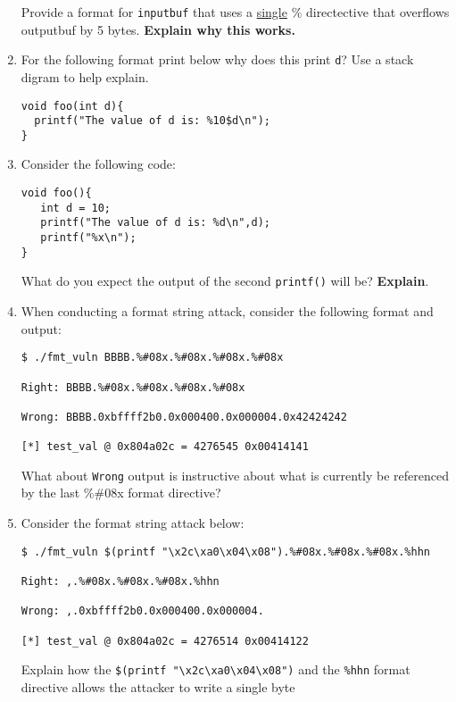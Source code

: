 \documentclass{article}[9pt]
\begin{document}
\begin{enumerate}
Provide a format for \texttt{inputbuf} that uses a \uline{single} \%
directective that overflows outputbuf by 5 bytes. \textbf{Explain why
this works.}

\item For the following format print below why does this print \texttt{d}? Use
a stack digram to help explain.

\begin{verbatim}
void foo(int d){
  printf("The value of d is: %10$d\n");
}
\end{verbatim}

\item Consider the following code:

\begin{verbatim}
void foo(){
   int d = 10;
   printf("The value of d is: %d\n",d);
   printf("%x\n");
}
\end{verbatim}

What do you expect the output of the second \texttt{printf()} will be? \textbf{Explain}.

\item When conducting a format string attack, consider the following
format and output:

\begin{verbatim}
$ ./fmt_vuln BBBB.%#08x.%#08x.%#08x.%#08x

Right: BBBB.%#08x.%#08x.%#08x.%#08x

Wrong: BBBB.0xbffff2b0.0x000400.0x000004.0x42424242

[*] test_val @ 0x804a02c = 4276545 0x00414141 
\end{verbatim}

What about \texttt{Wrong} output is instructive about what is currently
be referenced by the last \%\#08x format directive?

\item Consider the format string attack below:

\begin{verbatim}
$ ./fmt_vuln $(printf "\x2c\xa0\x04\x08").%#08x.%#08x.%#08x.%hhn

Right: ,.%#08x.%#08x.%#08x.%hhn

Wrong: ,.0xbffff2b0.0x000400.0x000004.

[*] test_val @ 0x804a02c = 4276514 0x00414122
\end{verbatim}

Explain how the \texttt{\$(printf "\textbackslash{}x2c\textbackslash{}xa0\textbackslash{}x04\textbackslash{}x08")} and the \texttt{\%hhn}
format directive allows the attacker to write a single byte


\end{enumerate}
\end{document}
